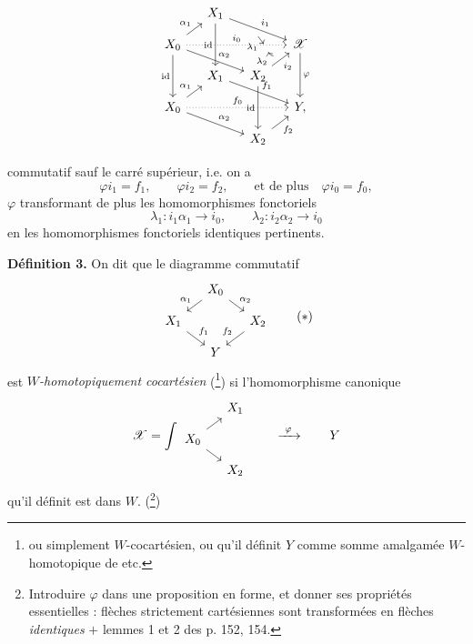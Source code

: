 \documentclass[11pt]{article}
\newcommand{\printedpage}[1]{\marginpar{\footnotesize p.~#1}}
\newcommand{\msp}[1]{\marginpar{\footnotesize [#1]}}
\newcommand{\sX}{\mathscr{X}}
\begin{document}
\msp{page 131}
\[
\begin{tikzcd}[row sep=small, column sep=small]
 & X_1 \arrow[dd, "\mathrm{id}"'] \arrow[rrd, "i_1", ""'{name=I1}] & & \\
X_0 \arrow[ru, "\alpha_1"] \arrow[rrr, dotted, "i_0", ""'{name=I0, pos=0.8}] \arrow[rrd, "\alpha_2"] \arrow[dd, "\mathrm{id}"'] & & & \sX \arrow[dd, "\varphi"] \\
 & X_1 \arrow[rrd, "f_1"] & X_2 \arrow[ru, "i_2"', ""{name=I2}] \arrow[dd, "\mathrm{id}"'] & \\
X_0 \arrow[ru, "\alpha_1"] \arrow[rrr, dotted, "f_0"] \arrow[rrd, "\alpha_2"] & & & Y, \\
 & & X_2 \arrow[ru, "f_2"'] &
\arrow[from=I1, to=I0, "\lambda_1"', shorten <=1pt, shorten >=1pt]
\arrow[from=I2, to=I0, bend left, "\lambda_2", shorten <=1pt, shorten >=1pt] %
\end{tikzcd}
\]

\printedpage{89}
commutatif sauf le carré supérieur, i.e. on a
\[
\varphi i_1 = f_1, \qquad \varphi i_2 = f_2, \qquad \text{et de plus} \quad \varphi i_0 = f_0,
\]
$\varphi$ transformant de plus les homomorphismes fonctoriels
\[
\lambda_1 : i_1\alpha_1 \longrightarrow i_0, \qquad \lambda_2 : i_2\alpha_2 \longrightarrow i_0
\]
en les homomorphismes fonctoriels identiques pertinents.

\setcounter{footnote}{85}
\textbf{Définition 3.} On dit que le diagramme commutatif
\[
\begin{tikzcd}[row sep=small, column sep=small]
 & X_0 \arrow[dl, "\alpha_1"'] \arrow[dr, "\alpha_2"] & \\
X_1 \arrow[dr, "f_1"] & & X_2 \arrow[dl, "f_2"'] \\
 & Y &
\end{tikzcd}
\tag*{$(*)$}
\]
est \textit{$W$-homotopiquement cocartésien} (\footnote{ou simplement $W$-cocartésien, ou qu'il définit $Y$ comme somme amalgamée $W$-homotopique de etc.}) si l'homomorphisme canonique
\[
\sX = \int
\begin{tikzcd}[row sep=small, column sep=small]
 & X_1 \\
X_0 \arrow[ur] \arrow[dr] & \\
 & X_2
\end{tikzcd}
\qquad \xrightarrow{\ \varphi\ } \qquad Y
\]
qu'il définit est dans $W$. (\footnote{Introduire $\varphi$ dans une proposition en forme, et donner ses propriétés essentielles : flèches strictement cartésiennes sont transformées en flèches \textit{identiques} $+$ lemmes 1 et 2 des p. 152, 154.})
\end{document}
